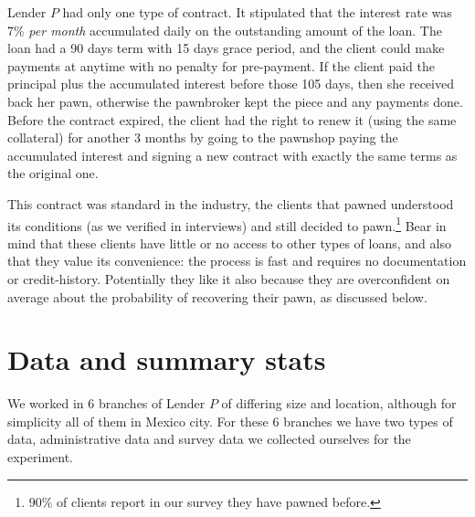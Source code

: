 \documentclass[11pt]{article}
\begin{document}
Lender $P$ had only one type of contract. It stipulated that the interest rate was 7\% \textit{per month} accumulated daily on the outstanding amount of the loan. The loan had a 90 days term with 15 days grace period, and the client could make payments at anytime with no penalty for pre-payment. If the client paid the principal plus the accumulated interest before those 105 days, then she received back her pawn, otherwise the pawnbroker kept the piece and any payments done. Before the contract expired, the client had the right to renew it (using the same collateral) for another 3 months by going to the pawnshop paying the accumulated interest and signing a new contract with exactly the same terms as the original one. %

This contract was standard in the industry, the clients that pawned understood its conditions (as we verified in interviews) and still decided to pawn.\footnote{90\% of clients report in our survey they have pawned before.} Bear in mind that these clients have little or no access to other types of loans, and also that they value its convenience: the process is fast and requires no documentation or credit-history. Potentially they like it also because they are overconfident on average about the probability of recovering their pawn, as discussed below.

    
\section{Data and summary stats} \label{Data}
    
We worked in 6 branches of Lender $P$ of differing size and location, although for simplicity all of them in Mexico city. For these 6 branches we have two types of data, administrative data and survey data we collected ourselves for the experiment. 
\end{document}
